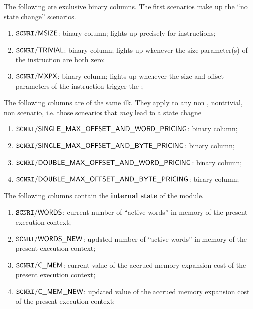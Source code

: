 The following are exclusive binary columns.
The first scenarios make up the ``no state change'' scenarios.
\begin{enumerate}
	\item $\texttt{SCNRI}\textsf{/}{\textsf{MSIZE}}$:
		binary column;
		lights up precisely for  instructions;
	\item $\texttt{SCNRI}\textsf{/}{\textsf{TRIVIAL}}$:
		binary column;
		lights up whenever the size parameter(s) of the instruction are both zero;
	\item $\texttt{SCNRI}\textsf{/}{\textsf{MXPX}}$:
		binary column;
		lights up whenever the size and offset parameters of the instruction trigger the \mxpxSH{};
\end{enumerate}
The following columns are of the same ilk.
They apply to any
non ,
nontrivial,
non \mxpxSH{} scenario,
i.e. those scnearios that \emph{may} lead to a state chagne.
\begin{enumerate}[resume]
	\item $\texttt{SCNRI}\textsf{/}{\textsf{SINGLE\_MAX\_OFFSET\_AND\_WORD\_PRICING}}$:
		binary column;
	\item $\texttt{SCNRI}\textsf{/}{\textsf{SINGLE\_MAX\_OFFSET\_AND\_BYTE\_PRICING}}$:
		binary column;
	\item $\texttt{SCNRI}\textsf{/}{\textsf{DOUBLE\_MAX\_OFFSET\_AND\_WORD\_PRICING}}$:
		binary column;
	\item $\texttt{SCNRI}\textsf{/}{\textsf{DOUBLE\_MAX\_OFFSET\_AND\_BYTE\_PRICING}}$:
		binary column;
\end{enumerate}
The following columns contain the \textbf{internal state} of the \mxpMod{} module.
\begin{enumerate}[resume]
	\item $\texttt{SCNRI}\textsf{/}{\textsf{\textsf{WORDS}}}$:
		current number of ``active words'' in memory of the present execution context;
	\item $\texttt{SCNRI}\textsf{/}{\textsf{\textsf{WORDS\_NEW}}}$:
		updated number of ``active words'' in memory of the present execution context;
	\item $\texttt{SCNRI}\textsf{/}{\textsf{\textsf{C\_MEM}}}$:
		current value of the accrued memory expansion cost of the present execution context;
	\item $\texttt{SCNRI}\textsf{/}{\textsf{\textsf{C\_MEM\_NEW}}}$:
		updated value of the accrued memory expansion cost of the present execution context;
\end{enumerate}
